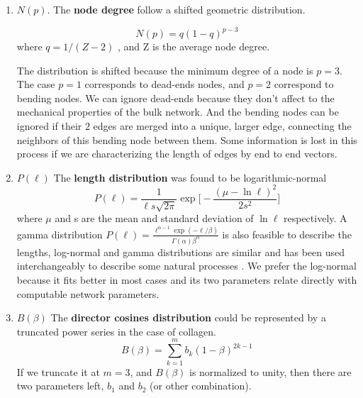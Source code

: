 \begin{enumerate} 
\item \textbf{$N(p)$}. The \textbf{node degree} follow a shifted geometric
distribution.

\begin{equation} \label{degree-dist}
N(p)=q(1-q)^{p-3} 
\end{equation}
where $q=1/(Z-2)$ , and Z is the average node degree.

The distribution is shifted because the minimum degree of a node is
$p=3$. The case $p=1$ corresponds to dead-ends nodes, and $p=2$ correspond to
bending nodes. We can ignore dead-ends because they don't affect to the mechanical properties of the bulk network. And the bending nodes
can be ignored if their $2$ edges are merged into a unique, larger edge,
connecting the neighbors of this bending node between them. Some information is lost in this
process if we are characterizing the length of edges by end to end
vectors.

\item \textbf{$P(\ell)$} The \textbf{length distribution} was found to be
logarithmic-normal
\begin{equation} \label{length-dist}
P(\ell)=\frac{1}{\ell
s\sqrt{2\pi}}\exp{\bigg[-\frac{(\mu-\ln{\ell})^2}{2s^2}\bigg]}
\end{equation}
where $\mu$ and s are the mean and standard deviation of $\ln{\ell}$
respectively.
A gamma distribution \( P(\ell) = \frac{\ell^{\alpha - 1}\exp(-\ell/\beta)}{\Gamma(\alpha)\beta^\alpha} \) is also feasible to describe the lengths,
log-normal and gamma distributions are similar and has been used
interchangeably to describe some natural processes \cite{cho_comparison_2004}.
We prefer the log-normal because it fits better in most cases and its two parameters
relate directly with computable network parameters.

\item \textbf{$B(\beta)$} The \textbf{director cosines distribution} could be
represented by a truncated power series in the case of collagen.
\begin{equation} \label{cosines-dist}
B(\beta)=\sum_{k=1}^{m} b_k(1-\beta)^{2k-1}
\end{equation}
If we truncate it at $m=3$, and $B(\beta)$ is normalized to unity, then there
are two parameters left, $b_1$ and $b_2$ (or other combination).
\end{enumerate}

